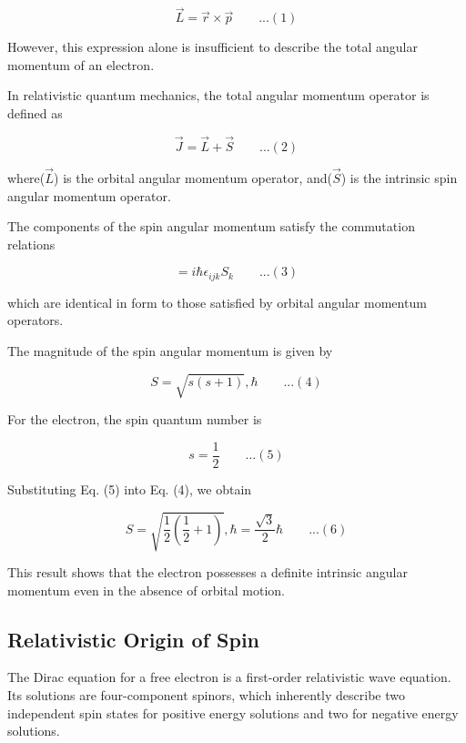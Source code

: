 \documentclass[12pt]{report}
\begin{document}
\begin{equation*}
\vec{L} = \vec{r} \times \vec{p}\qquad ...(1)
\end{equation*}

However, this expression alone is insufficient to describe the total angular momentum of an electron.

In relativistic quantum mechanics, the total angular momentum operator is defined as

\begin{equation*}
\vec{J} = \vec{L} + \vec{S}\qquad ...(2)
\end{equation*}

where($\vec{L}$) is the orbital angular momentum operator, and($\vec{S}$) is the intrinsic spin angular momentum operator.

The components of the spin angular momentum satisfy the commutation relations

\begin{equation*}
[S_i, S_j] = i\hbar \epsilon_{ijk} S_k\qquad ...(3)
\end{equation*}

which are identical in form to those satisfied by orbital angular momentum operators.

The magnitude of the spin angular momentum is given by

\begin{equation*}
S = \sqrt{s(s+1)},\hbar\qquad ...(4)
\end{equation*}

For the electron, the spin quantum number is

\begin{equation*}
s = \frac{1}{2}\qquad ...(5)
\end{equation*}

Substituting Eq. (5) into Eq. (4), we obtain

\begin{equation*}
S = \sqrt{\frac{1}{2}\left(\frac{1}{2}+1\right)},\hbar= \frac{\sqrt{3}}{2}\hbar\qquad ...(6)
\end{equation*}

This result shows that the electron possesses a definite intrinsic angular momentum even in the absence of orbital motion.

\subsection*{Relativistic Origin of Spin}

The Dirac equation for a free electron is a first-order relativistic wave equation. Its solutions are four-component spinors, which inherently describe two independent spin states for positive energy solutions and two for negative energy solutions.
\end{document}
